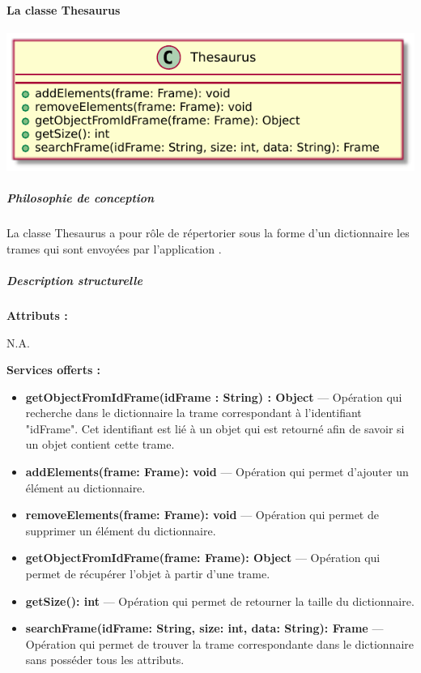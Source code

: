 \paragraph{La classe Thesaurus}

\begin{minipage}
    {\linewidth}
    \centering
    \includegraphics[width=0.80\linewidth]{../schemas/Conception_detaillee/classe_thesaurus.pdf}
\end{minipage}

\subparagraph{Philosophie de conception \newline} 

\medspace

La classe Thesaurus a pour rôle de répertorier sous la forme d'un dictionnaire les trames qui sont envoyées par l'application {\nomApplication}.

\subparagraph{Description structurelle \newline}

\medspace

\textbf{Attributs :}

N.A.

\textbf{Services offerts :}

\begin{itemize}
    \item \textbf{getObjectFromIdFrame(idFrame : String) : Object} --- Opération qui recherche dans le dictionnaire la trame correspondant à l'identifiant "idFrame". Cet identifiant est lié à un objet qui est retourné afin de savoir si un objet contient cette trame.
    \item \textbf{addElements(frame: Frame): void} --- Opération qui permet d'ajouter un élément au dictionnaire.
    \item \textbf{removeElements(frame: Frame): void} --- Opération qui permet de supprimer un élément du dictionnaire. 
    \item \textbf{getObjectFromIdFrame(frame: Frame): Object} --- Opération qui permet de récupérer l'objet à partir d'une trame.
    \item \textbf{getSize(): int} --- Opération qui permet de retourner la taille du dictionnaire. 
    \item \textbf{searchFrame(idFrame: String, size: int, data: String): Frame} --- Opération qui permet de trouver la trame correspondante dans le dictionnaire sans posséder tous les attributs. 
\end{itemize}